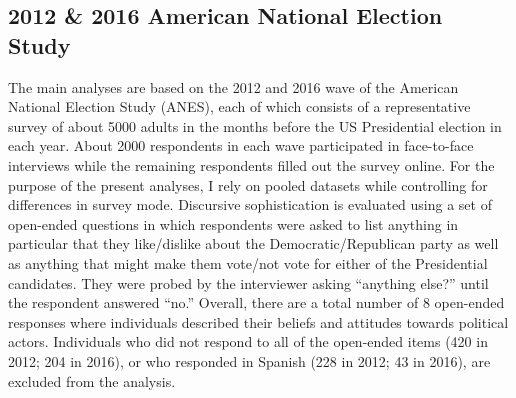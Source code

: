 \subsection*{2012 \& 2016 American National Election Study}
The main analyses are based on the 2012 and 2016 wave of the American National Election Study (ANES), each of which consists of a representative survey of about 5000 adults in the months before the US Presidential election in each year. About 2000 respondents in each wave participated in face-to-face interviews while the remaining respondents filled out the survey online. For the purpose of the present analyses, I rely on pooled datasets while controlling for differences in survey mode. Discursive sophistication is evaluated using a set of open-ended questions in which respondents were asked to list anything in particular that they like/dislike about the Democratic/Republican party as well as anything that might make them vote/not vote for either of the Presidential candidates. They were probed by the interviewer asking ``anything else?'' until the respondent answered ``no.'' Overall, there are a total number of 8 open-ended responses where individuals described their beliefs and attitudes towards political actors. Individuals who did not respond to all of the open-ended items (420 in 2012; 204 in 2016), or who responded in Spanish (228 in 2012; 43 in 2016), are excluded from the analysis.


